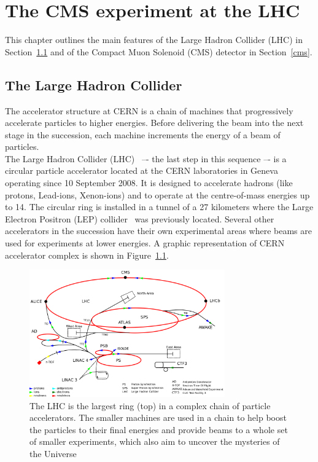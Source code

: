 \chapter{The CMS experiment at the LHC} \label{Chapter2} 



This chapter outlines the main features of the Large
Hadron Collider (LHC) in Section~\ref{lhc} and of the Compact Muon Solenoid (CMS)
detector in Section~\ref{cms}. 



\section{The Large Hadron Collider}\label{lhc}
The accelerator structure at CERN is a chain of machines that
progressively accelerate particles to higher energies. Before delivering the beam into the next stage in the succession, each machine
increments the energy of a beam of particles.\\
The Large Hadron Collider (LHC)~\cite{Brning2004LHCDR} –- the last step in this sequence –- is a circular particle accelerator
located at the CERN laboratories in Geneva operating since 10
September 2008. It is
designed to accelerate hadrons (like protons, Lead-ions, Xenon-ions) and to
operate at the centre-of-mass energies up to 14\TeV.
The circular ring is installed in a tunnel of a 27 kilometers where
the Large Electron Positron (LEP) collider~\cite{Lep:designReport} was
previously located. Several other accelerators in the succession have
their own experimental areas where beams are used for experiments at lower energies.
A graphic representation of CERN accelerator
complex is shown in Figure~\ref{fig:cern}. 

\begin{figure}[h]
\centering
\includegraphics[width=0.75\textwidth]{Figures/c2/Cern-accelerator-complex.png}
\vspace*{3mm}
\caption{The LHC is the largest ring (top) in a complex chain of particle accelerators. The smaller machines are used in a chain to help boost the particles to their final energies and provide beams to a whole set of smaller experiments, which also aim to uncover the mysteries of the Universe~\cite{Mobs:2197559}}
\label{fig:cern}
\end{figure}

